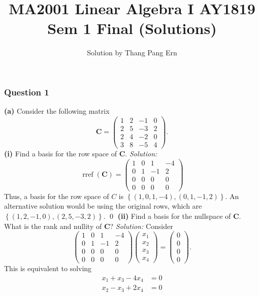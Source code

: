 \documentclass{article}
\title{MA2001 Linear Algebra I AY1819 Sem 1 Final (Solutions)}
\author{Solution by Thang Pang Ern}
\begin{document}
\maketitle
\subsubsection*{Question 1}
\textbf{(a)} Consider the following matrix \[\mathbf{C}=\begin{pmatrix}1&2&-1&0\\2&5&-3&2\\2&4&-2&0\\3&8&-5&4\end{pmatrix}.\]
\textbf{(i)} Find a basis for the row space of $\mathbf{C}$.
\newline\newline\textit{Solution:} \[\operatorname{rref}(\mathbf{C})=\begin{pmatrix}1&0&1&-4\\0&1&-1&2\\0&0&0&0\\0&0&0&0\end{pmatrix}\]
Thus, a basis for the row space of $C$ is $\left\{(1,0,1,-4),(0,1,-1,2)\right\}$. An alternative solution would be using the original rows, which are $\left\{(1,2,-1,0),(2,5,-3,2)\right\}$. \qed 
\newline\newline\textbf{(ii)} Find a basis for the nullspace of $\mathbf{C}$. What is the rank and nullity of $\mathbf{C}$?
\newline
\newline\textit{Solution:} Consider \[\begin{pmatrix}1&0&1&-4\\0&1&-1&2\\0&0&0&0\\0&0&0&0\end{pmatrix}\begin{pmatrix}x_1\\x_2\\x_3\\x_4\end{pmatrix}=\begin{pmatrix}0\\0\\0\\0\end{pmatrix}.\] This is equivalent to solving \begin{align*}
    x_1+x_3-4x_4&=0\\
    x_2-x_3+2x_4&=0
\end{align*}
\end{document}
